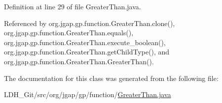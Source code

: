 Definition at line 29 of file Greater\-Than.\-java.



Referenced by org.\-jgap.\-gp.\-function.\-Greater\-Than.\-clone(), org.\-jgap.\-gp.\-function.\-Greater\-Than.\-equals(), org.\-jgap.\-gp.\-function.\-Greater\-Than.\-execute\-\_\-boolean(), org.\-jgap.\-gp.\-function.\-Greater\-Than.\-get\-Child\-Type(), and org.\-jgap.\-gp.\-function.\-Greater\-Than.\-Greater\-Than().



The documentation for this class was generated from the following file\-:\begin{DoxyCompactItemize}
\item 
L\-D\-H\-\_\-\-Git/src/org/jgap/gp/function/\hyperlink{_greater_than_8java}{Greater\-Than.\-java}\end{DoxyCompactItemize}
